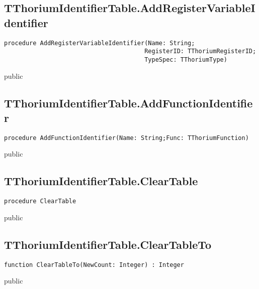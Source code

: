 \subsection{TThoriumIdentifierTable.AddRegisterVariableIdentifier}
\label{thoriumcore:thorium:tthoriumidentifiertable:addregistervariableidentifier}
\begin{FPCList}
\Synopsis
\Declaration 

\begin{verbatim}
procedure AddRegisterVariableIdentifier(Name: String;
                                       RegisterID: TThoriumRegisterID;
                                       TypeSpec: TThoriumType)
\end{verbatim}
\Visibility
public
\Description
\Errors
\end{FPCList}
\subsection{TThoriumIdentifierTable.AddFunctionIdentifier}
\label{thoriumcore:thorium:tthoriumidentifiertable:addfunctionidentifier}
\begin{FPCList}
\Synopsis
\Declaration 

\begin{verbatim}
procedure AddFunctionIdentifier(Name: String;Func: TThoriumFunction)
\end{verbatim}
\Visibility
public
\Description
\Errors
\end{FPCList}
\subsection{TThoriumIdentifierTable.ClearTable}
\label{thoriumcore:thorium:tthoriumidentifiertable:cleartable}
\begin{FPCList}
\Synopsis
\Declaration 

\begin{verbatim}
procedure ClearTable
\end{verbatim}
\Visibility
public
\Description
\Errors
\end{FPCList}
\subsection{TThoriumIdentifierTable.ClearTableTo}
\label{thoriumcore:thorium:tthoriumidentifiertable:cleartableto}
\begin{FPCList}
\Synopsis
\Declaration 

\begin{verbatim}
function ClearTableTo(NewCount: Integer) : Integer
\end{verbatim}
\Visibility
public
\Description
\Errors
\end{FPCList}
